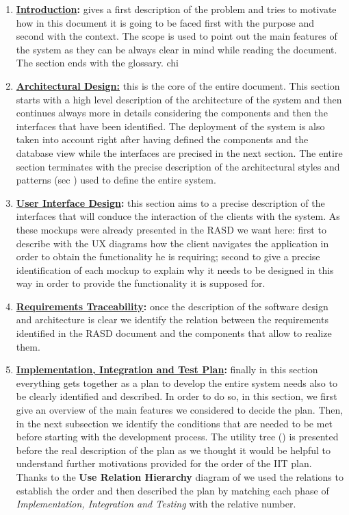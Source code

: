 		\begin{enumerate}
			\item \textbf{\hyperref[sec:introduction]{Introduction}:} gives a first description of the problem and tries to motivate how in this document it is going to be faced first with the purpose and second with the context. The scope is used to point out the main features of the system as they can be always clear in mind while reading the document. The section ends with the glossary.
chi			
			\item \textbf{\hyperref[sec:architecturalDesign]{Architectural Design:}} this is the core of the entire document. This section starts with a high level description of the architecture of the system and then continues always more in details considering the components and then the interfaces that have been identified. The deployment of the system is also taken into account right after having defined the components and the database view while the interfaces are precised in the next section. The entire section terminates with the precise description of the architectural styles and patterns (sec ) used to define the entire system.
			
			\item \textbf{\hyperref[sec:userInterfaceDesign]{User Interface Design}:} this section aims to a precise description of the interfaces that will conduce the interaction of the clients with the system. As these mockups were already presented in the RASD we want here: first to describe with the UX diagrams how the client navigates the application in order to obtain the functionality he is requiring; second to give a precise identification of each mockup to explain why it needs to be designed in this way in order to provide the functionality it is supposed for.
			
			\item \textbf{\hyperref[sec:requirementsTraceability]{Requirements Traceability}:} once the description of the software design and architecture is clear we identify the relation between the requirements identified in the RASD document \cite{RASD} and the components that allow to realize them.
			
			\item \textbf{\hyperref[sec:iitPlan]{Implementation, Integration and Test Plan}:} finally in this section everything gets together as a plan to develop the entire system needs also to be clearly identified and described. In order to do so, in this section, we first give an overview of the main features we considered to decide the plan. Then, in the next subsection we identify the conditions that are needed to be met before starting with the development process. The utility tree () is presented before the real description of the plan as we thought it would be helpful to understand further motivations provided for the order of the IIT plan. Thanks to the \textbf{Use Relation Hierarchy} diagram of  we used the relations to establish the order and then described the plan by matching each phase of \emph{Implementation, Integration and Testing} with the relative number.
			

\end{enumerate}
